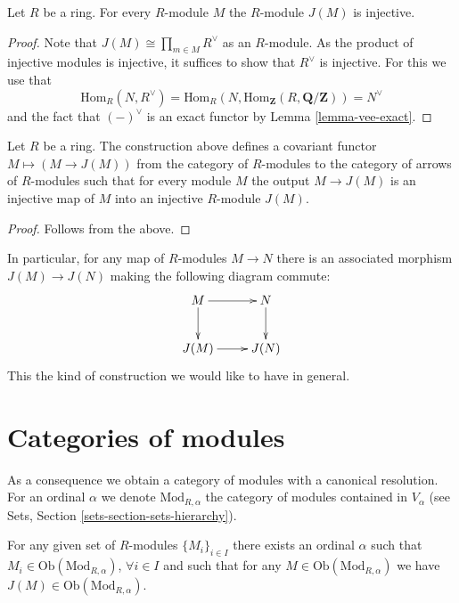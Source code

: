 \begin{lemma}
\label{lemma-JM-injective}
Let $R$ be a ring. For every $R$-module $M$ the
$R$-module $J(M)$ is injective.
\end{lemma}

\begin{proof}
Note that $J(M) \cong \prod_{m\in M} R^\vee$ as an $R$-module.
As the product of injective modules is injective, it suffices to
show that $R^\vee$ is injective. For this we use that 
$$
\text{Hom}_R(N, R^\vee) =
\text{Hom}_R(N, \text{Hom}_{\mathbf{Z}}(R, \mathbf{Q}/\mathbf{Z})) =
N^\vee
$$
and the
fact that $(-)^\vee$ is an exact functor by Lemma
\ref{lemma-vee-exact}.
\end{proof}

\begin{lemma}
\label{lemma-injectives-modules}
Let $R$ be a ring.
The construction above defines a covariant functor
$M \mapsto (M \to J(M))$ from the category of
$R$-modules to the category of arrows of $R$-modules
such that for every module $M$ the output
$M \to J(M)$ is an injective map of $M$ into
an injective $R$-module $J(M)$.
\end{lemma}

\begin{proof}
Follows from the above.
\end{proof}

\noindent
In particular, for any map of $R$-modules $M \to N$ 
there is an associated morphism $J(M) \to J(N)$
making the following diagram commute:
$$
\xymatrix{
M \ar[d] \ar[r] & N \ar[d] \\
J(M) \ar[r] & J(N) }
$$
This the kind of construction we would like to have in general.

\section{Categories of modules}
\label{section-category-modules}

\noindent
As a consequence we obtain a category of modules with a canonical
resolution. For an ordinal $\alpha$ we denote $\text{Mod}_{R,\alpha}$
the category of modules contained in $V_\alpha$ (see Sets, 
Section \ref{sets-section-sets-hierarchy}).

\begin{lemma}
\label{lemma-injective-module-preserves-category}
For any given set of $R$-modules $\{M_i\}_{i\in I}$ there exists an ordinal
$\alpha$ such that $M_i \in \text{Ob}(\text{Mod}_{R,\alpha})$,
$\forall i\in I$ and such that for any
$M \in \text{Ob}(\text{Mod}_{R,\alpha})$ we have
$J(M) \in \text{Ob}(\text{Mod}_{R,\alpha})$.
\end{lemma}

